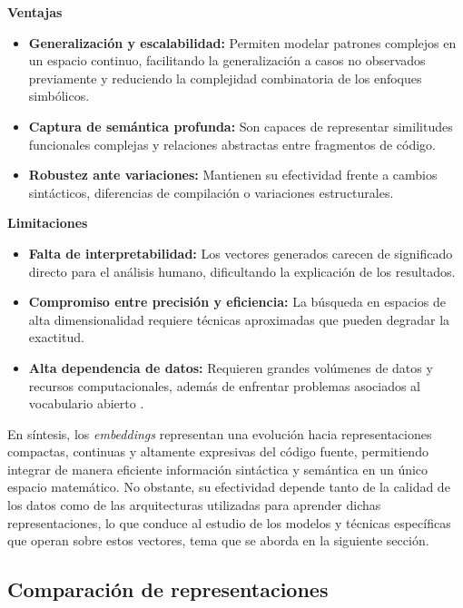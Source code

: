 \textbf{Ventajas}
\begin{itemize}
    \item \textbf{Generalización y escalabilidad:} Permiten modelar patrones complejos en un espacio continuo, facilitando la generalización a casos no observados previamente y reduciendo la complejidad combinatoria de los enfoques simbólicos.
    
    \item \textbf{Captura de semántica profunda:} Son capaces de representar similitudes funcionales complejas y relaciones abstractas entre fragmentos de código\cite{Alon2018Code2Vec}.
    
    \item \textbf{Robustez ante variaciones:} Mantienen su efectividad frente a cambios sintácticos, diferencias de compilación o variaciones estructurales\cite{Gagnon2025Beyond}.
\end{itemize}

\textbf{Limitaciones}
\begin{itemize}
    \item \textbf{Falta de interpretabilidad:} Los vectores generados carecen de significado directo para el análisis humano, dificultando la explicación de los resultados.
    
    \item \textbf{Compromiso entre precisión y eficiencia:} La búsqueda en espacios de alta dimensionalidad requiere técnicas aproximadas que pueden degradar la exactitud.
    
    \item \textbf{Alta dependencia de datos:} Requieren grandes volúmenes de datos y recursos computacionales, además de enfrentar problemas asociados al vocabulario abierto \cite{Gagnon2025Beyond}.
\end{itemize}

En síntesis, los \textit{embeddings} representan una evolución hacia representaciones compactas, continuas y altamente expresivas del código fuente, permitiendo integrar de manera eficiente información sintáctica y semántica en un único espacio matemático. No obstante, su efectividad depende tanto de la calidad de los datos como de las arquitecturas utilizadas para aprender dichas representaciones, lo que conduce al estudio de los modelos y técnicas específicas que operan sobre estos vectores, tema que se aborda en la siguiente sección.

\subsection{Comparación de representaciones}

